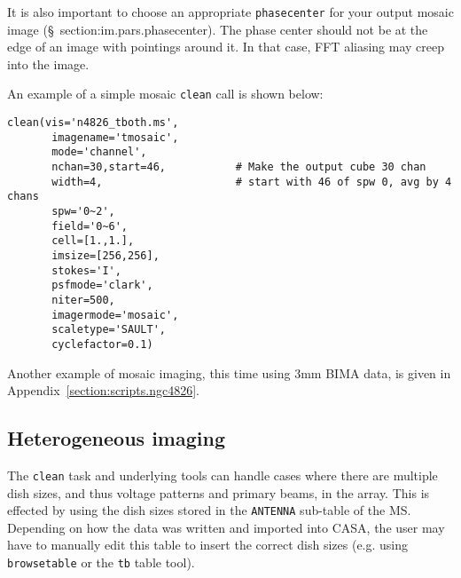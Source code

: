 It is also important to choose an appropriate {\tt phasecenter} for
your output mosaic image (\S~{section:im.pars.phasecenter}). The phase
center should not be at the edge of an image with pointings around
it. In that case, FFT aliasing may creep into the image. 


An example of a simple mosaic {\tt clean} call is shown below: 
\small
\begin{verbatim}
clean(vis='n4826_tboth.ms',        
       imagename='tmosaic',         
       mode='channel',
       nchan=30,start=46,           # Make the output cube 30 chan
       width=4,                     # start with 46 of spw 0, avg by 4 chans
       spw='0~2',
       field='0~6',
       cell=[1.,1.],
       imsize=[256,256],
       stokes='I',
       psfmode='clark',
       niter=500,
       imagermode='mosaic',
       scaletype='SAULT',
       cyclefactor=0.1)
\end{verbatim}
\normalsize

Another example of mosaic imaging, this time using 3mm BIMA data,
is given in Appendix~\ref{section:scripts.ngc4826}.

\subsection{Heterogeneous imaging}
\label{section:im.clean.hetero}

The {\tt clean} task and underlying tools can handle cases where
there are multiple dish sizes, and thus voltage patterns and primary
beams, in the array.  This is effected by using the dish sizes stored
in the {\tt ANTENNA} sub-table of the MS.  Depending on how the data
was written and imported into CASA, the user may have to manually edit
this table to insert the correct dish sizes (e.g. using {\tt
browsetable} or the {\tt tb} table tool).  


